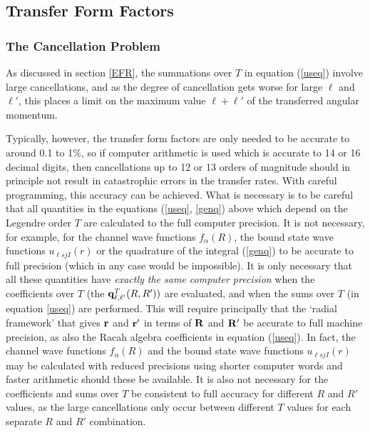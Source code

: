 \documentclass[11pt,a4paper]{article}
\newcommand{\vecr}{{\bf r}}
\newcommand{\vecR}{{\bf R}}
\begin{document}
\subsection{Transfer Form Factors}
\subsubsection{The Cancellation Problem}

As discussed in section \ref{EFR},
the summations over $T$ in equation (\ref{useq}) involve large cancellations,
and as the degree of cancellation gets worse for large
$ \ell $ and $ \ell' $, this places a limit
on the maximum value $ \ell + \ell' $ of the
transferred angular momentum.

Typically, however, the transfer form factors are only needed to be accurate to
around 0.1 to 1\%,
so if computer arithmetic is used which is accurate to 14 or
16 decimal digits, then cancellations up to 12 or 13 orders of magnitude
should in principle not result in catastrophic errors in the transfer
rates.  With careful programming, this accuracy can be achieved.
What is necessary is to be careful that all quantities in the equations
(\ref{useq}, \ref{genq}) above which depend on the Legendre order $T$ are calculated
to the full computer precision.  It is not necessary, for example,
for the channel wave functions $ f _\alpha (R) $, the bound
state wave functions $u_{\ell sjI} (r) $ or the
quadrature of the integral (\ref{genq}) to be accurate to full precision
(which in any case would be impossible). It is only necessary
that all these quantities have {\em exactly the same computer
precision} when the coefficients over $T$ (the
${\bf q}_{\ell , \ell'}^T (R,R') )$ are evaluated,
and when the sums over $T$ (in equation \ref{useq}) are performed.
This will require principally that the `radial framework' that gives
$ \vecr $ and $ \vecr' $ in terms of $\vecR$ and $\vecR'$
be accurate to full machine precision, as also the Racah algebra
coefficients in equation (\ref{useq}). In fact, the channel wave functions
$ f _\alpha (R) $ and the bound state wave functions
$u_{\ell sjI} (r) $ may be calculated with reduced precisions
using shorter computer words and faster arithmetic should
these be available. It is also not necessary for the coefficients and sums
over $T$ be consistent to full accuracy for different $R$ and
$R'$ values, as the large cancellations only occur between
different $T$ values for each separate $R$ and $R'$ combination.
\end{document}
